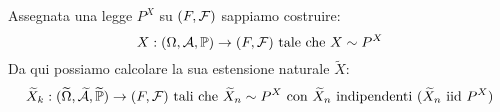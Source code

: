 \medskip
\begin{ese}
  Assegnata una legge $P^X$ su $(F, \mathcal F)$ sappiamo costruire:
  $$ X: (\Omega, \mathcal A, \mathbb P) \to (F, \mathcal F) \text{ tale che } X \sim P^X$$
  Da qui possiamo calcolare la sua estensione naturale $\widetilde{X}$:
  $$\widetilde{X}_k: (\widetilde{\Omega}, \widetilde{\mathcal A}, \widetilde{\mathbb P}) \to (F, \mathcal F) \text{ tali che } \widetilde{X}_n \sim P^X \text{ con } \widetilde{X}_n \text{ indipendenti } (\widetilde{X}_n \text{ iid } P^X)$$
\end{ese}

\cleardoublepage
